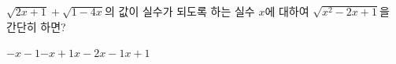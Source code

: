\hspace*{2mm}\begin{minipage}[t]{\dimexpr\linewidth-2mm\relax}\vspace{0pt}
$\sqrt{2x+1}+\sqrt{1-4x}$의 값이 실수가 되도록 하는 실수 $x$에 대하여 $\sqrt{x^2-2x+1}$을 간단히 하면?
\begin{choices32}{$-x-1$}{$-x+1$}{$x-2$}{$x-1$}{$x+1$}\end{choices32}\end{minipage}
